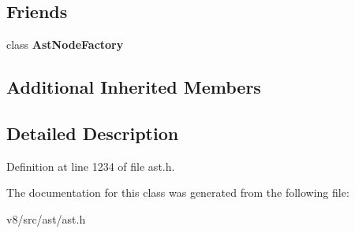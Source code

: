 \subsection*{Friends}
\begin{DoxyCompactItemize}
\item 
\mbox{\label{classv8_1_1internal_1_1RegExpLiteral_a8d587c8ad3515ff6433eb83c578e795f}} 
class {\bfseries Ast\+Node\+Factory}
\end{DoxyCompactItemize}
\subsection*{Additional Inherited Members}


\subsection{Detailed Description}


Definition at line 1234 of file ast.\+h.



The documentation for this class was generated from the following file\+:\begin{DoxyCompactItemize}
\item 
v8/src/ast/ast.\+h\end{DoxyCompactItemize}
